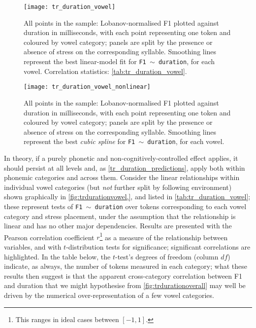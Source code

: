 \begin{figure}[H]
  \centering
  \texttt{[image: tr\_duration\_vowel]}
  \caption[Duration plotted against F1, linear fit by vowel category.]{All points in the sample: Lobanov-normalised F1 plotted against duration in milliseconds, with each point representing one token and coloured by vowel category; panels are split by the presence or absence of stress on the corresponding syllable. Smoothing lines represent the best linear-model fit for \texttt{F1 $\sim$ duration}, for each vowel. Correlation statistics: \cref{tab:tr_duration_vowel}.}
  \label{fig:trdurationvowel}
\end{figure}

\begin{figure}[H]
  \centering
  \texttt{[image: tr\_duration\_vowel\_nonlinear]}
  \caption[Duration plotted against F1, cubic spline fit by vowel category.]{All points in the sample: Lobanov-normalised F1 plotted against duration in milliseconds, with each point representing one token and coloured by vowel category; panels are split by the presence or absence of stress on the corresponding syllable. Smoothing lines represent the best \textit{cubic spline} for \texttt{F1 $\sim$ duration}, for each vowel.}
  \label{fig:trdurationvowel_nonlinear}
\end{figure}

In theory, if a purely phonetic and non-cognitively-controlled effect applies, it should persist at all levels and, as \cref{tr_duration_predictions}, apply both within phonemic categories and across them. Consider the linear relationships within individual vowel categories (but \emph{not} further split by following environment) shown graphically in \cref{fig:trdurationvowel,}, and listed in \cref{tab:tr_duration_vowel}; these represent tests of \texttt{F1 $\sim$ duration} over tokens corresponding to each vowel category and stress placement, under the assumption that the relationship is linear and has no other major dependencies. Results are presented with the Pearson correlation coefficient $r$\footnote{This ranges in ideal cases between $[-1, 1]$.} as a measure of the relationship between variables, and with $t$-distribution tests for significance; significant correlations are highlighted. In the table below, the $t$-test's degrees of freedom (column $df$) indicate, as always, the number of tokens measured in each category; what these results then suggest is that the apparent cross-category correlation between F1 and duration that we might hypothesise from \cref{fig:trdurationoverall} may well be driven by the numerical over-representation of a few vowel categories.

